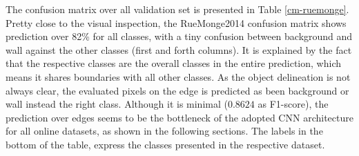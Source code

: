 The confusion matrix over all validation set is presented in Table \ref{cm-ruemonge}. Pretty close to the visual inspection, the RueMonge2014 confusion matrix shows prediction over 82\% for all classes, with a tiny confusion between background and wall against the other classes (first and forth columns). It is explained by the fact that the respective classes are the overall classes in the entire prediction, which means it shares boundaries with all other classes. As the object delineation is not always clear, the evaluated pixels on the edge is predicted as been background or wall instead the right class. Although it is minimal ($0.8624$ as F1-score), the prediction over edges seems to be the bottleneck of the adopted CNN architecture for all online datasets, as shown in the following sections. The labels in the bottom of the table, express the classes presented in the respective dataset.

